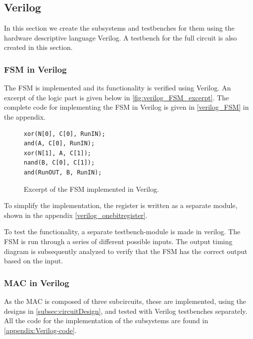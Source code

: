 \subsection{Verilog}

In this section we create the subsystems and testbenches for them using the hardware descriptive language Verilog. A testbench for the full circuit is also created in this section.

\subsubsection{FSM in Verilog}
\label{subsec:fsm_verilog}

The FSM is implemented and its functionality is verified using Verilog. An excerpt of the logic part is given below in \autoref{fig:verilog_FSM_excerpt}. The complete code for implementing the FSM in Verilog is given in \autoref{verilog_FSM} in the appendix.


\begin{figure}[H]
\centering
\begin{minipage}{0.33\textwidth}
\begin{lstlisting}[style=verilogStyle]
xor(N[0], C[0], RunIN);
and(A, C[0], RunIN);
xor(N[1], A, C[1]);
nand(B, C[0], C[1]);
and(RunOUT, B, RunIN);
\end{lstlisting}
\end{minipage}
\caption{Excerpt of the FSM implemented in Verilog.}
\label{fig:verilog_FSM_excerpt}
\end{figure}


To simplify the implementation, the register is written as a separate module, shown in the appendix \autoref{verilog_onebitregister}.

To test the functionality, a separate testbench-module is made in verilog. The FSM is run through a series of different possible inputs. The output timing diagram is subsequently analyzed to verify that the FSM has the correct output based on the input.

\subsubsection{MAC in Verilog}
\label{subsubsec:MAC_in_verilog}

As the MAC is composed of three subcircuits, these are implemented, using the designs in \autoref{subsec:circuitDesign}, and tested with Verilog testbenches separately. All the code for the implementation of the subsystems are found in \autoref{appendix:Verilog-code}. 

